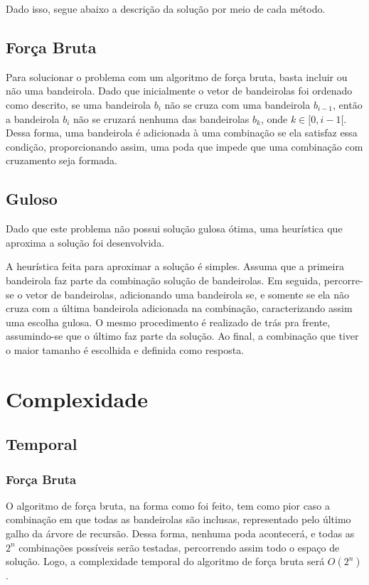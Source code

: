 \documentclass[
	12pt,
	a4paper,
	onepage,
	brazil
]{article}
\begin{document}
	Dado isso, segue abaixo a descrição da solução por meio de cada método.
	
	\subsection{Força Bruta}
	
	Para solucionar o problema com um algoritmo de força bruta, basta incluir ou não uma bandeirola. Dado que inicialmente o vetor de bandeirolas foi ordenado como descrito, se uma bandeirola $b_i$ não se cruza com uma bandeirola $b_{i-1}$, então a bandeirola $b_i$ não se cruzará nenhuma das bandeirolas $b_k$, onde $k \in [0, i-1[$. Dessa forma, uma bandeirola é adicionada à uma combinação se ela satisfaz essa condição, proporcionando assim, uma poda que impede que uma combinação com cruzamento seja formada.
	
	\subsection{Guloso}
	
	Dado que este problema não possui solução gulosa ótima, uma heurística que aproxima a solução foi desenvolvida.
	
	A heurística feita para aproximar a solução é simples. Assuma que a primeira bandeirola faz parte da combinação solução de bandeirolas. Em seguida, percorre-se o vetor de bandeirolas, adicionando uma bandeirola se, e somente se ela não cruza com a última bandeirola adicionada na combinação, caracterizando assim uma escolha gulosa. O mesmo procedimento é realizado de trás pra frente, assumindo-se que o último faz parte da solução. Ao final, a combinação que tiver o maior tamanho é escolhida e definida como resposta.
	
	\section{Complexidade}
	
	\subsection{Temporal}
	
	\subsubsection{Força Bruta}
	
	O algoritmo de força bruta, na forma como foi feito, tem como pior caso a combinação em que todas as bandeirolas são inclusas, representado pelo último galho da árvore de recursão. Dessa forma, nenhuma poda acontecerá, e todas as $2^n$ combinações possíveis serão testadas, percorrendo assim todo o espaço de solução. Logo, a complexidade temporal do algoritmo de força bruta será $O(2^n)$.
\end{document}
